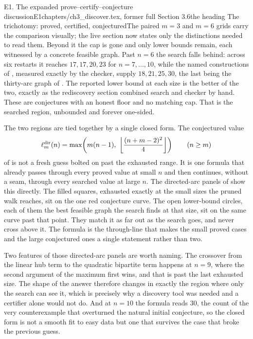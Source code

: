 \begin{offcut}{E1. The expanded prove--certify--conjecture discussion}{E1}{chapters/ch3\_discover.tex, former full Section 3.6}{the heading The trichotomy: proved, certified, conjectured}{The paired $m=3$ and $m=6$ grids carry the comparison visually; the live section now states only the distinctions needed to read them.}
Beyond it the cap is gone and only lower bounds remain, each witnessed by a concrete feasible graph. Past $n = 6$ the search falls behind: across six restarts it reaches $17, 17, 20, 23$ for $n = 7, \dots, 10$, while the named constructions of , measured exactly by the checker, supply $18, 21, 25, 30$, the last being the thirty-arc graph of . The reported lower bound at each size is the better of the two, exactly as the rediscovery section combined search and checker by hand. These are conjectures with an honest floor and no matching cap. That is the searched region, unbounded and forever one-sided.

The two regions are tied together by a single closed form. The conjectured value
\[
    \ell_m^{\mathrm{dir}}(n) = \max\!\left(m(n-1),\ \left\lfloor \frac{(n+m-2)^2}{4} \right\rfloor\right)
    \qquad (n \ge m)
\]
of  is not a fresh guess bolted on past the exhausted range. It is one formula that already passes through every proved value at small $n$ and then continues, without a seam, through every searched value at large $n$. The directed-arc panels of  show this directly. The filled squares, exhausted exactly at the small sizes the pruned walk reaches, sit on the one red conjecture curve. The open lower-bound circles, each of them the best feasible graph the search finds at that size, sit on the same curve past that point. They match it as far out as the search goes, and never cross above it. The formula is the through-line that makes the small proved cases and the large conjectured ones a single statement rather than two.

Two features of those directed-arc panels are worth naming. The crossover from the linear hub term to the quadratic bipartite term happens at $n = 9$, where the second argument of the maximum first wins, and that is past the last exhausted size. The shape of the answer therefore changes in exactly the region where only the search can see it, which is precisely why a discovery tool was needed and a certifier alone would not do. And at $n = 10$ the formula reads $30$, the count of the very counterexample that overturned the natural initial conjecture, so the closed form is not a smooth fit to easy data but one that survives the case that broke the previous guess.


\end{offcut}
